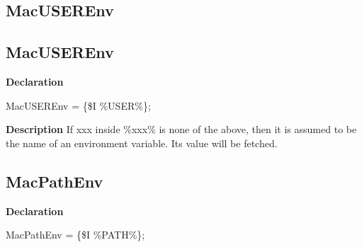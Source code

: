 \documentclass{report}
\newif\ifpdf
\begin{document}
\subsection*{\large{\textbf{MacUSEREnv}}\normalsize\hspace{1ex}\hrulefill}
\else
\subsection*{MacUSEREnv}
\fi
\label{ok_include_environment-MacUSEREnv}
\begin{list}{}{
\setlength{\itemindent}{0cm}
\setlength{\listparindent}{0cm}
\setlength{\leftmargin}{\evensidemargin}
\addtolength{\leftmargin}{\tmplength}
\settowidth{\labelsep}{X}
\addtolength{\leftmargin}{\labelsep}
\setlength{\labelwidth}{\tmplength}
}
\item[\textbf{Declaration}\hfill]
\ifpdf
\begin{flushleft}
\fi
\begin{ttfamily}
MacUSEREnv = {\{}{\$}I {\%}USER{\%}{\}};\end{ttfamily}

\ifpdf
\end{flushleft}
\fi

\par
\item[\textbf{Description}]
If xxx inside {\%}xxx{\%} is none of the above, then it is assumed to be the name of an environment variable. Its value will be fetched.

\end{list}
\ifpdf
\subsection*{\large{\textbf{MacPathEnv}}\normalsize\hspace{1ex}\hrulefill}
\else
\subsection*{MacPathEnv}
\fi
\label{ok_include_environment-MacPathEnv}
\begin{list}{}{
\setlength{\itemindent}{0cm}
\setlength{\listparindent}{0cm}
\setlength{\leftmargin}{\evensidemargin}
\addtolength{\leftmargin}{\tmplength}
\settowidth{\labelsep}{X}
\addtolength{\leftmargin}{\labelsep}
\setlength{\labelwidth}{\tmplength}
}
\item[\textbf{Declaration}\hfill]
\ifpdf
\begin{flushleft}
\fi
\begin{ttfamily}
MacPathEnv = {\{}{\$}I {\%}PATH{\%}{\}};\end{ttfamily}

\ifpdf
\end{flushleft}
\fi

\end{list}
\end{document}
